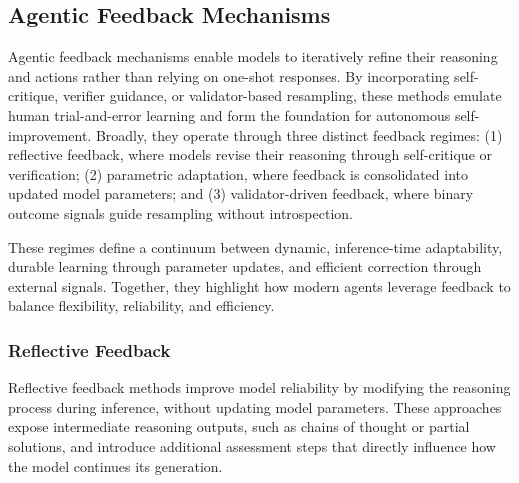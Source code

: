 



\subsection{Agentic Feedback Mechanisms}

Agentic feedback mechanisms enable models to iteratively refine their reasoning and actions rather than relying on one-shot responses. By incorporating self-critique, verifier guidance, or validator-based resampling, these methods emulate human trial-and-error learning and form the foundation for autonomous self-improvement. Broadly, they operate through three distinct feedback regimes:
(1) reflective feedback, where models revise their reasoning through self-critique or verification;
(2) parametric adaptation, where feedback is consolidated into updated model parameters; and
(3) validator-driven feedback, where binary outcome signals guide resampling without introspection.

These regimes define a continuum between dynamic, inference-time adaptability, durable learning through parameter updates, and efficient correction through external signals. Together, they highlight how modern agents leverage feedback to balance flexibility, reliability, and efficiency.

\subsubsection{Reflective Feedback}

Reflective feedback methods improve model reliability by modifying the reasoning process during inference, without updating model parameters. These approaches expose intermediate reasoning outputs, such as chains of thought or partial solutions, and introduce additional assessment steps that directly influence how the model continues its generation.

